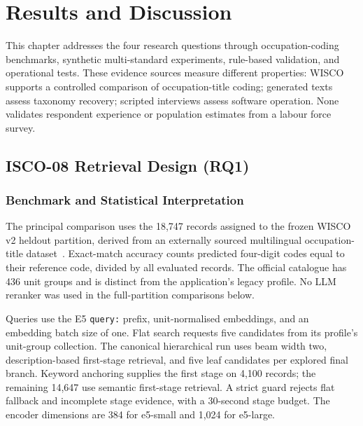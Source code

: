 \chapter{Results and Discussion}
\label{chap:results}

This chapter addresses the four research questions through occupation-coding
benchmarks, synthetic multi-standard experiments, rule-based validation,
and operational tests. These evidence sources measure different properties:
WISCO supports a controlled comparison of occupation-title coding; generated
texts assess taxonomy recovery; scripted interviews assess software
operation. None validates respondent experience or population estimates
from a labour force survey.

\section{ISCO-08 Retrieval Design (RQ1)}
\label{sec:res-isco}

\subsection{Benchmark and Statistical Interpretation}

The principal comparison uses the 18,747 records assigned to the frozen
WISCO v2 heldout partition, derived from an externally sourced multilingual
occupation-title dataset~\cite{wisco2023}. Exact-match accuracy counts
predicted four-digit codes equal to their reference code, divided by all
evaluated records. The official catalogue has 436 unit groups and is
distinct from the application's legacy profile. No LLM reranker was used
in the full-partition comparisons below.

Queries use the E5 \texttt{query:} prefix, unit-normalised embeddings,
and an embedding batch size of one. Flat search requests five candidates
from its profile's unit-group collection. The canonical hierarchical run
uses beam width two, description-based first-stage retrieval, and five
leaf candidates per explored final branch. Keyword anchoring supplies
the first stage on 4,100 records; the remaining 14,647 use semantic
first-stage retrieval. A strict guard rejects flat fallback and incomplete
stage evidence, with a 30-second stage budget. The encoder dimensions are
384 for e5-small and 1,024 for e5-large.

